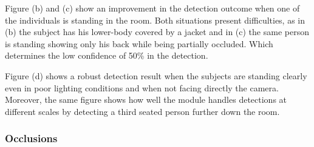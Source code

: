 Figure (b) and (c) show an improvement in the detection outcome when one of the individuals is standing in the room. Both situations present difficulties, as in (b) the subject has his lower-body covered by a jacket and in (c) the same person is standing showing only his back while being partially occluded. Which determines the low confidence of 50\% in the detection.

Figure (d) shows a robust detection result when the subjects are standing clearly even in poor lighting conditions and when not facing directly the camera. Moreover, the same figure shows how well the module handles detections at different scales by detecting a third seated person further down the room.

\subsubsection{Occlusions}

